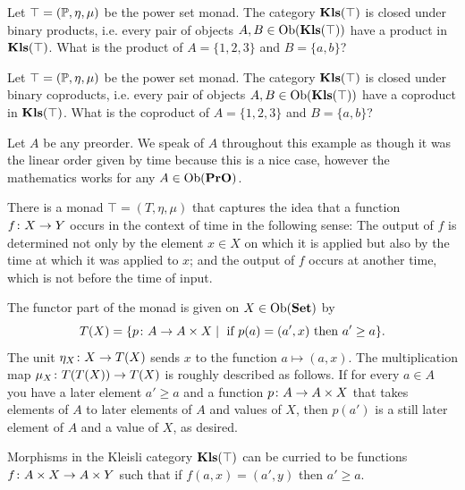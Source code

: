 \begin{exercise}
Let $\top=({\mathbb P},\eta,\mu)$ be the power set monad. The category ${\bf Kls}(\top)$ is closed under binary products, i.e. every pair of objects $A,B\in\textnormal{Ob}({\bf Kls}(\top))$ have a product in ${\bf Kls}(\top)$. What is the product of $A=\{1,2,3\}$ and $B=\{a,b\}$?
\end{exercise}

\begin{exercise}
Let $\top=({\mathbb P},\eta,\mu)$ be the power set monad. The category ${\bf Kls}(\top)$ is closed under binary coproducts, i.e. every pair of objects $A,B\in\textnormal{Ob}({\bf Kls}(\top))$ have a coproduct in ${\bf Kls}(\top)$. What is the coproduct of $A=\{1,2,3\}$ and $B=\{a,b\}$?
\end{exercise}

\begin{example}\label{ex:preorder monad}

Let $A$ be any preorder. We speak of $A$ throughout this example as though it was the linear order given by time because this is a nice case, however the mathematics works for any $A\in\textnormal{Ob}({\bf PrO})$. 

There is a monad $\top=(T,\eta,\mu)$ that captures the idea that a function $f\colon X\rightarrow Y$ occurs in the context of time in the following sense: The output of $f$ is determined not only by the element $x\in X$ on which it is applied but also by the time at which it was applied to $x$; and the output of $f$ occurs at another time, which is not before the time of input.

The functor part of the monad is given on $X\in\textnormal{Ob}({\bf Set})$ by
$$T(X)=\{p\colon A\rightarrow A\times X{\;|\;}\textnormal{ if } p(a)=(a',x)\textnormal{ then } a'\geq a\}.$$
The unit $\eta_X\colon X\rightarrow T(X)$ sends $x$ to the function $a\mapsto (a,x)$. The multiplication map $\mu_X\colon T(T(X))\rightarrow T(X)$ is roughly described as follows. If for every $a\in A$ you have a later element $a'\geq a$ and a function $p\colon A\rightarrow A\times X$ that takes elements of $A$ to later elements of $A$ and values of $X$, then $p(a')$ is a still later element of $A$ and a value of $X$, as desired.

Morphisms in the Kleisli category ${\bf Kls}(\top)$ can be curried to be functions $f\colon A\times X\rightarrow A\times Y$ such that if $f(a,x)=(a',y)$ then $a'\geq a$. 

\end{example}

